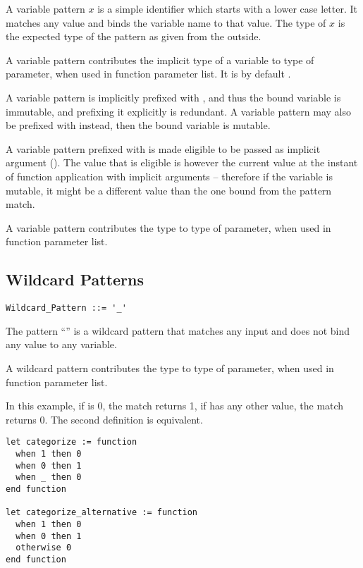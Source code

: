 A variable pattern $x$ is a simple identifier which starts with a lower case letter. It matches any value and binds the variable name to that value. The type of $x$ is the expected type of the pattern as given from the outside. 

A variable pattern contributes the implicit type of a variable to type of parameter, when used in function parameter list. It is by default . 

A variable pattern is implicitly prefixed with , and thus the bound variable is immutable, and prefixing it explicitly is redundant. A variable pattern may also be prefixed with  instead, then the bound variable is mutable. 

A variable pattern prefixed with  is made eligible to be passed as implicit argument (). The value that is eligible is however the current value at the instant of function application with implicit arguments -- therefore if the variable is mutable, it might be a different value than the one bound from the pattern match. 

A variable pattern contributes the type  to type of parameter, when used in function parameter list. 






\subsection{Wildcard Patterns}
\label{sec:wildcard-patterns}

\grammar\begin{lstlisting}
Wildcard_Pattern ::= '_'
\end{lstlisting}

The pattern ``\code{_}'' is a wildcard pattern that matches any input and does not bind any value to any variable. 

A wildcard pattern contributes the type  to type of parameter, when used in function parameter list. 

\example In this example, if  is 0, the match returns 1, if  has any other value, the match returns 0. The second definition is equivalent. 
\begin{lstlisting}
let categorize := function
  when 1 then 0
  when 0 then 1
  when _ then 0
end function

let categorize_alternative := function
  when 1 then 0
  when 0 then 1
  otherwise 0
end function
\end{lstlisting}

